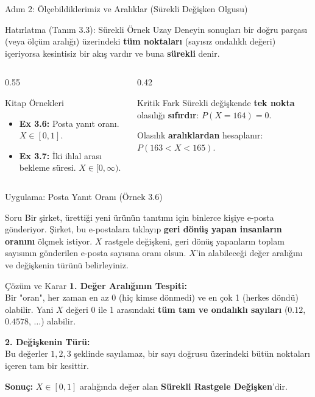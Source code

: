 ﻿\documentclass[light]{lutbeamer}
\begin{document}
\begin{frame}{Adım 2: Ölçebildiklerimiz ve Aralıklar (Sürekli Değişken Olgusu)}
\begin{block}{Hatırlatma (Tanım 3.3): Sürekli Örnek Uzay}
  Deneyin sonuçları bir doğru parçası (veya ölçüm aralığı) üzerindeki \textbf{tüm noktaları} (sayısız ondalıklı değeri) içeriyorsa kesintisiz bir akış vardır ve buna \textbf{sürekli} denir.
\end{block}

\begin{columns}[T]
  \begin{column}{0.55\textwidth}
    \begin{exampleblock}{Kitap Örnekleri}
      \begin{itemize}
        \item \textbf{Ex 3.6:} Posta yanıt oranı. $X \in [0, 1]$.
        \item \textbf{Ex 3.7:} İki ihlal arası bekleme süresi. $X \in [0, \infty)$.
      \end{itemize}
    \end{exampleblock}
  \end{column}
  \begin{column}{0.42\textwidth}
    \begin{alertblock}{Kritik Fark}
      Sürekli değişkende \textbf{tek nokta} olasılığı \textbf{sıfırdır}:
      $P(X = 164) = 0$.

      Olasılık \textbf{aralıklardan} hesaplanır:
      $P(163 < X < 165)$.
    \end{alertblock}
  \end{column}
\end{columns}
\end{frame}

\begin{frame}{Uygulama: Posta Yanıt Oranı (Örnek 3.6)}
\small
\begin{block}{Soru}
  Bir şirket, ürettiği yeni ürünün tanıtımı için binlerce kişiye e-posta gönderiyor. 
  Şirket, bu e-postalara tıklayıp \textbf{geri dönüş yapan insanların oranını} ölçmek istiyor. 
  $X$ rastgele değişkeni, geri dönüş yapanların toplam sayısının gönderilen e-posta sayısına oranı olsun.
  $X$'in alabileceği değer aralığını ve değişkenin türünü belirleyiniz.
\end{block}

\begin{alertblock}{Çözüm ve Karar}
  \textbf{1. Değer Aralığının Tespiti:} \\
  Bir "oran", her zaman en az 0 (hiç kimse dönmedi) ve en çok 1 (herkes döndü) olabilir.
  Yani $X$ değeri 0 ile 1 arasındaki \textbf{tüm tam ve ondalıklı sayıları} ($0.12$, $0.4578$, $\dots$) alabilir.
  \vspace{0.15cm}
  
  \textbf{2. Değişkenin Türü:} \\
  Bu değerler $1, 2, 3$ şeklinde sayılamaz, bir sayı doğrusu üzerindeki bütün noktaları içeren tam bir kesittir.
  
  \textbf{Sonuç:} $X \in [0, 1]$ aralığında değer alan \textbf{Sürekli Rastgele Değişken}'dir.
\end{alertblock}
\end{frame}
\end{document}

